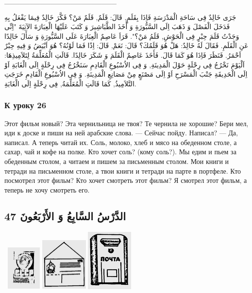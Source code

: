 \documentclass[a5paper]{article}
\begin{document}
\_\_\_\_\_\_\_\_\_\_\_\_\_\_\_\_\_\_\_\_\_\_

جَرَى خَالِدٌ فِى سَاحَةِ الْمَدْرَسَةِ فَاِذَا بِقَلَمٍ, قَالَ: قَلَمٌ, قَلَمٌ مَنْ؟ فَكَّرَ خَالِدٌ فِيمَا يَفْعَلُ بِهِ فَدَخَلَ الْفَصْلَ وَ ذَهَبَ اِلَى السَّبُّورَةِ وَ أَخَذَ الطَّبَاشِيرَ وَ كَتَبَ عَلَيْهَا الْعِبَارَةَ الآتِيَةَ "اِنِّى وَجَدْتُ قَلَمَ حِبْرٍ فِى الْحَوْشِ, قَلَمُ مَنْ؟". قَرَاَ عَاصِمٌ الْعِبَارَةَ عَلَى السَّبُّورَةِ وَ سَأَلَ خَالِدًا عَنِ الْقَلَمِ. فَقَالَ لَهُ خَالِدٌ: هَلْ هُوَ قَلَمُكَ؟ قَالَ: نَعَمْ, قَالَ: اِذًا فَمَا لَوْنُهُ؟ هُوَ اَبْيَضُ وَ فِيهِ حِبْرٌ اَحْمَرُ. فَنَظَرَ فَاِذَا هُوَ كَمَا قَالَ. فَأَخَذَ عَاصِمٌ الْقَلَمَ وَ شَكَرَ خَالِدًا. قَالَتِ الْمُعَلِّمَةُ لِتَلاَمِيذِهَا: اَلْيَوْمَ نَخْرُجُ فِى رِحْلَةٍ حَوْلَ الْمَدِينَةِ, وَ فِى الاُسْبُوعِ الْقَادِمِ سَنَخْرُجُ فِى رِحْلَةٍ اِلَى الْغَابَةِ اَوْ اِلَى الْحَدِيقَةِ جَنْبَ الْمَسْرَحِ اَوْ اِلَى مَصْنَعٍ مِنْ مَصَانِعِ الْمَدِينَةِ. وَ فِى الاُسْبُوعِ الْقَادِمِ خَرَجَتِ التَّلاَمِيذُ, كَمَا قَالَتِ الْمُعَلِّمَةُ, فِى رِحْلَةٍ اِلَى الْغَابَةِ.

\subsubsection{К уроку 26}
Этот фильм новый? Эта чернильница не твоя? Те чернила не хорошие? Бери мел, иди к доске и пиши на ней арабские слова. — Сейчас пойду. Написал? — Да, написал. А теперь читай их. Соль, молоко, хлеб и мясо на обеденном столе, а сахар, чай и кофе на полке. Кто хочет соль? (кому соль?). Мы едим и пьем за обеденным столом, а читаем и пишем за письменным столом. Мои книги и тетради на письменном столе, а твои книги и тетради на парте в портфеле. Кто посмотрел этот фильм? Кто хочет смотреть этот фильм? Я смотрел этот фильм, а теперь не хочу смотреть его.

\subsection{الدَّرْسُ السَّابِعُ وَ الأَرْبَعُونَ 47}
\  \includegraphics[width=0.6874in,height=0.8957in]{images/MuhammadBagauddinprettified-img149.png}   \includegraphics[width=0.9374in,height=1.052in]{images/MuhammadBagauddinprettified-img150.png}   \includegraphics[width=0.9272in,height=1.2291in]{images/MuhammadBagauddinprettified-img151.png} 
\end{document}

